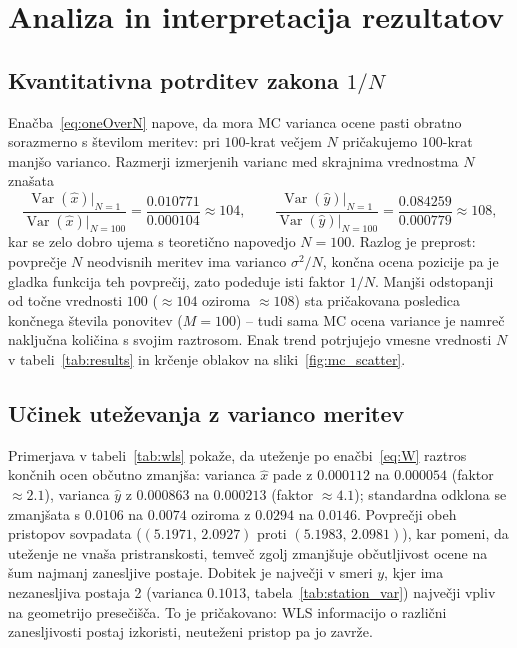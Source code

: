 \documentclass[a4paper,11pt]{article}
\begin{document}
\section{Analiza in interpretacija rezultatov}
\label{sec:analiza}

\subsection{Kvantitativna potrditev zakona $1/N$}
Enačba~\eqref{eq:oneOverN} napove, da mora MC varianca ocene pasti obratno sorazmerno s številom meritev: pri $100$-krat večjem $N$ pričakujemo $100$-krat manjšo varianco. Razmerji izmerjenih varianc med skrajnima vrednostma $N$ znašata
\[
\frac{\operatorname{Var}(\hat{x})\big|_{N=1}}{\operatorname{Var}(\hat{x})\big|_{N=100}} = \frac{0.010771}{0.000104} \approx 104,
\qquad
\frac{\operatorname{Var}(\hat{y})\big|_{N=1}}{\operatorname{Var}(\hat{y})\big|_{N=100}} = \frac{0.084259}{0.000779} \approx 108,
\]
kar se zelo dobro ujema s teoretično napovedjo $N = 100$. Razlog je preprost: povprečje $N$ neodvisnih meritev ima varianco $\sigma^2/N$, končna ocena pozicije pa je gladka funkcija teh povprečij, zato podeduje isti faktor $1/N$. Manjši odstopanji od točne vrednosti $100$ ($\approx 104$ oziroma $\approx 108$) sta pričakovana posledica končnega števila ponovitev ($M=100$) -- tudi sama MC ocena variance je namreč naključna količina s svojim raztrosom. Enak trend potrjujejo vmesne vrednosti $N$ v tabeli~\ref{tab:results} in krčenje oblakov na sliki~\ref{fig:mc_scatter}.

\subsection{Učinek uteževanja z varianco meritev}
Primerjava v tabeli~\ref{tab:wls} pokaže, da uteženje po enačbi~\eqref{eq:W} raztros končnih ocen občutno zmanjša: varianca $\hat{x}$ pade z $0.000112$ na $0.000054$ (faktor $\approx 2.1$), varianca $\hat{y}$ z $0.000863$ na $0.000213$ (faktor $\approx 4.1$); standardna odklona se zmanjšata s $0.0106$ na $0.0074$ oziroma z $0.0294$ na $0.0146$. Povprečji obeh pristopov sovpadata ($(5.1971,\,2.0927)$ proti $(5.1983,\,2.0981)$), kar pomeni, da uteženje ne vnaša pristranskosti, temveč zgolj zmanjšuje občutljivost ocene na šum najmanj zanesljive postaje. Dobitek je največji v smeri $y$, kjer ima nezanesljiva postaja 2 (varianca $0.1013$, tabela~\ref{tab:station_var}) največji vpliv na geometrijo presečišča. To je pričakovano: WLS informacijo o različni zanesljivosti postaj izkoristi, neuteženi pristop pa jo zavrže.
\end{document}
